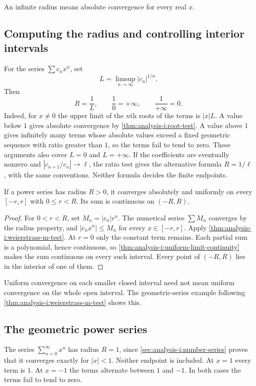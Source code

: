 An infinite radius means absolute convergence for every real $x$.


\subsection{Computing the radius and controlling interior intervals}
For the series $\sum c_nx^n$, set
\[
  L=\limsup_{n\to\infty}|c_n|^{1/n}.
\]
Then
\[
  R=\frac1L,\qquad \frac10=+\infty,\qquad \frac1{+\infty}=0.
\]
Indeed, for $x\ne0$ the upper limit of the $n$th roots of the terms
is $|x|L$. A value below $1$ gives absolute convergence by
\autoref{thm:analysis-i:root-test}. A value above $1$ gives infinitely
many terms whose absolute values exceed a fixed geometric sequence
with ratio greater than $1$, so the terms fail to tend to zero.
These arguments also cover $L=0$ and $L=+\infty$.
If the coefficients are eventually nonzero and
$|c_{n+1}/c_n|\to\ell$, the ratio test gives the alternative formula
$R=1/\ell$, with the same conventions. Neither formula decides the
finite endpoints.

\begin{proposition}
  \label{thm:analysis-i:power-series-local-uniform}
  If a power series has radius $R>0$, it converges absolutely and
  uniformly on every $[-r,r]$ with $0\le r<R$. Its sum is continuous
  on $(-R,R)$.
\end{proposition}
\begin{proof}
  For $0<r<R$, set $M_n=|c_n|r^n$. The numerical series $\sum M_n$
  converges by the radius property, and $|c_nx^n|\le M_n$ for every
  $x\in[-r,r]$. Apply \autoref{thm:analysis-i:weierstrass-m-test}.
  At $r=0$ only the constant term remains. Each partial sum is a
  polynomial, hence continuous, so
  \autoref{thm:analysis-i:uniform-limit-continuity} makes the sum
  continuous on every such interval. Every point of $(-R,R)$ lies
  in the interior of one of them.
\end{proof}
Uniform convergence on each smaller closed interval need not mean
uniform convergence on the whole open interval. The geometric-series
example following \autoref{thm:analysis-i:weierstrass-m-test} shows this.


\subsection{The geometric power series}

The series $\sum_{n=0}^{\infty}x^n$ has radius $R=1$, since
\autoref{sec:analysis-i:number-series} proves that it converges exactly
for $|x|<1$. Neither endpoint is included. At $x=1$ every term is $1$.
At $x=-1$ the terms alternate between $1$ and $-1$. In both cases the
terms fail to tend to zero.


